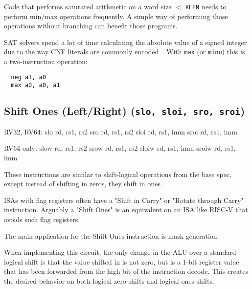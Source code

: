Code that performs saturated arithmetic on a word size $<$ \texttt{XLEN} needs to perform
min/max operations frequently. A simple way of performing those operations without branching
can benefit those programs.

SAT solvers spend a lot of time calculating the absolute value of a signed
integer due to the way CNF literals are commonly encoded~\cite{BiereComm}. With
\texttt{max} (or \texttt{minu}) this is a two-instruction operation:

\begin{minipage}{\linewidth}
\begin{verbatim}
  neg a1, a0
  max a0, a0, a1
\end{verbatim}
\end{minipage}


\subsection{Shift Ones (Left/Right) (\texttt{slo,\ sloi,\ sro,\ sroi})}

\begin{rvb}
  RV32, RV64:
    slo rd, rs1, rs2
    sro rd, rs1, rs2
    sloi rd, rs1, imm
    sroi rd, rs1, imm

  RV64 only:
    slow rd, rs1, rs2
    srow rd, rs1, rs2
    sloiw rd, rs1, imm
    sroiw rd, rs1, imm
\end{rvb}

These instructions are similar to shift-logical operations from the base
spec, except instead of shifting in zeros, they shift in ones.



ISAs with flag registers often have a "Shift in Carry" or "Rotate through Carry" instruction.
Arguably a "Shift Ones" is an equivalent on an ISA like RISC-V that avoids such flag registers.

The main application for the Shift Ones instruction is mask generation.

When implementing this circuit, the only change in the ALU over a
standard logical shift is that the value shifted in is not zero, but is
a 1-bit register value that has been forwarded from the high bit of the
instruction decode. This creates the desired behavior on both logical
zero-shifts and logical ones-shifts.


